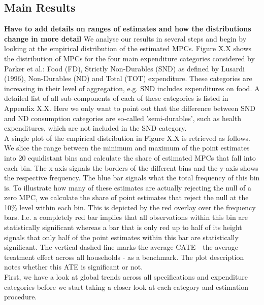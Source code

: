 \subsection{Main Results}
\textbf{Have to add details on ranges of estimates and how the distributions change in more detail}
We analyse our results in several steps and begin by looking at the empirical distribution of the estimated MPCs. Figure X.X shows the distribution of MPCs for the four main expenditure categories considered by Parker et al.: Food (FD), Strictly Non-Durables (SND) as defined by Lusardi (1996), Non-Durables (ND) and Total (TOT) expenditure. These categories are increasing in their level of aggregation, e.g. SND includes expenditures on food. A detailed list of all sub-components of each of these categories is listed in Appendix X.X. Here we only want to point out that the difference between SND and ND consumption categories are so-called 'semi-durables', such as health expenditures, which are not included in the SND category. \\
A single plot of the empirical distribution in Figure X.X is retrieved as follows. We slice the range between the minimum and maximum of the point estimates into 20 equidistant bins and calculate the share of estimated MPCs that fall into each bin. The x-axis signals the borders of the different bins and the y-axis shows the respective frequency. The blue bar signals what the total frequency of this bin is. To illustrate how many of these estimates are actually rejecting the null of a zero MPC, we calculate the share of point estimates that reject the null at the 10\% level within each bin. This is depicted by the red overlay over the frequency bars. I.e. a completely red bar implies that all observations within this bin are statistically significant whereas a bar that is only red up to half of its height signals that only half of the point estimates within this bar are statistically significant. The vertical dashed line marks the average CATE - the average treatment effect across all households - as a benchmark. The plot description notes whether this ATE is significant or not. \\ 
First, we have a look at global trends across all specifications and expenditure categories before we start taking a closer look at each category and estimation procedure. \\
